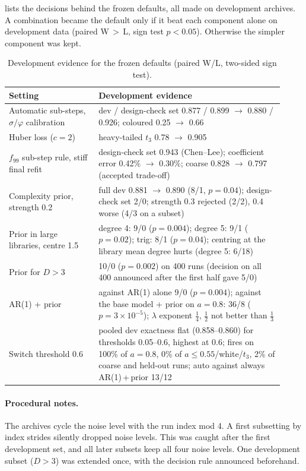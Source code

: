  lists the decisions behind the frozen defaults, all made on development archives. A combination became the default only if it beat each component alone on development data (paired W\,$>$\,L, sign test $p<0.05$). Otherwise the simpler component was kept.

\begin{table}[h]
\centering
\caption{Development evidence for the frozen defaults (paired W/L, two-sided sign test).}
\label{tab:dev}
\small
\begin{tabular}{@{}p{0.30\linewidth}p{0.62\linewidth}@{}}
\toprule
Setting & Development evidence \\
\midrule
Automatic sub-steps, $\sigma/\varphi$ calibration & dev / design-check set 0.877 / 0.899 $\to$ 0.880 / 0.926; coloured 0.25 $\to$ 0.66 \\
Huber loss ($c=2$) & heavy-tailed $t_3$ 0.78 $\to$ 0.905 \\
$f_{99}$ sub-step rule, stiff final refit & design-check set 0.943 (Chen--Lee); coefficient error 0.42\% $\to$ 0.30\%; coarse 0.828 $\to$ 0.797 (accepted trade-off) \\
Complexity prior, strength 0.2 & full dev 0.881 $\to$ 0.890 (8/1, $p=0.04$); design-check set 2/0; strength 0.3 rejected (2/2), 0.4 worse (4/3 on a subset) \\
Prior in large libraries, centre 1.5 & degree 4: 9/0 ($p=0.004$); degree 5: 9/1 ($p=0.02$); trig: 8/1 ($p=0.04$); centring at the library mean degree hurts (degree 5: 6/18) \\
Prior for $D>3$ & 10/0 ($p=0.002$) on 400 runs (decision on all 400 announced after the first half gave 5/0) \\
AR(1) + prior & against AR(1) alone 9/0 ($p=0.004$); against the base model + prior on $a=0.8$: 36/8 ($p=3\times10^{-5}$); $\lambda$ exponent $\tfrac14$, $\tfrac12$ not better than $\tfrac13$ \\
Switch threshold 0.6 & pooled dev exactness flat (0.858--0.860) for thresholds 0.05--0.6, highest at 0.6; fires on 100\% of $a=0.8$, 0\% of $a\le0.55$/white/$t_3$, 2\% of coarse and held-out runs; auto against always AR(1)\,+\,prior 13/12 \\
\bottomrule
\end{tabular}
\end{table}

\paragraph{Procedural notes.} The archives cycle the noise level with the run index mod 4. A first subsetting by index strides silently dropped noise levels. This was caught after the first development set, and all later subsets keep all four noise levels. One development subset ($D>3$) was extended once, with the decision rule announced beforehand.

